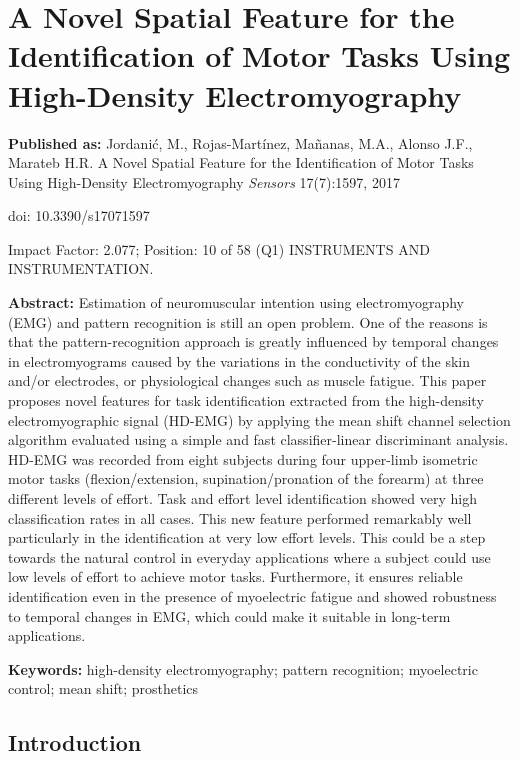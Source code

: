 \chapter[A Novel feature for task identification]{A Novel Spatial Feature for the Identification of Motor Tasks Using High-Density Electromyography}
\label{ch:p3}
\textbf{Published as:} 
Jordanić, M., Rojas-Martínez,  Ma\~nanas, M.A., Alonso J.F., Marateb H.R.
A Novel Spatial Feature for the Identification of Motor Tasks Using High-Density Electromyography 
\textit{Sensors} 17(7):1597, 2017

doi: 10.3390/s17071597

Impact Factor: 2.077; Position: 10 of 58 (Q1) INSTRUMENTS AND INSTRUMENTATION.


\textbf{Abstract:} Estimation of neuromuscular intention using electromyography (EMG) and pattern recognition is still an open problem. One of the reasons is that the pattern-recognition approach is greatly influenced by temporal changes in electromyograms caused by the variations in the conductivity of the skin and/or electrodes, or physiological changes such as muscle fatigue. This paper proposes novel features for task identification extracted from the high-density electromyographic signal (HD-EMG) by applying the mean shift channel selection algorithm evaluated using a simple and fast classifier-linear discriminant analysis. HD-EMG was recorded from eight subjects during four upper-limb isometric motor tasks (flexion/extension, supination/pronation of the forearm) at three different levels of effort. Task and effort level identification showed very high classification rates in all cases. This new feature performed remarkably well particularly in the identification at very low effort levels. This could be a step towards the natural control in everyday applications where a subject could use low levels of effort to achieve motor tasks. Furthermore, it ensures reliable identification even in the presence of myoelectric fatigue and showed robustness to temporal changes in EMG, which could make it suitable in long-term applications.

\textbf{Keywords:}  high-density electromyography; pattern recognition; myoelectric control; mean shift; prosthetics

\section{Introduction}

